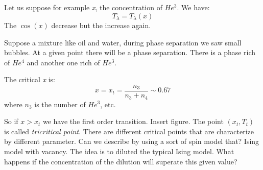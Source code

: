 \documentclass[../main/main.tex]{subfiles}
\begin{document}
Let us suppose for example \emph{x}, the concentration of \( He^3 \). We have:
\begin{equation}
  T_{\lambda}= T_ \lambda (x)
\end{equation}
The \( \cos(x) \) decrease but the increase again.

Suppose a mixture like oil and water, during phase separation we saw small bubbles. At a given point there will be a phase separation. There is a phase rich of \( He^4 \) and another one rich of \( He^3 \).

The critical \emph{x} is:
\begin{equation}
  x=x_t = \frac{n_3}{n_3+n_4} \sim 0.67
\end{equation}
where \( n_3 \) is the number of \( He^3 \), etc.

So if \( x > x_t \) we have the first order transition.
Insert figure.
The point \( (x_t,T_t) \) is called \emph{tricritical point}. There are different critical points that are characterize by different parameter.
Can we describe by using a sort of spin model that? Ising model with vacancy. The idea is to diluted the typical Ising model. What happens if the concentration of the dilution will superate this given value?  
\end{document}

